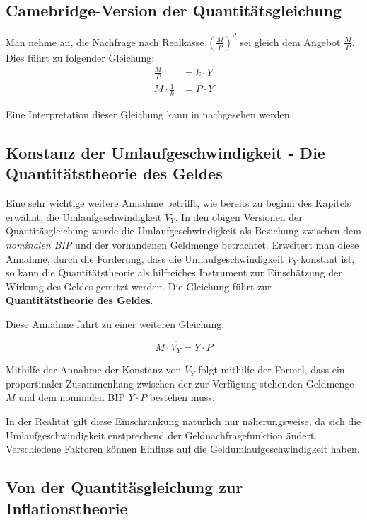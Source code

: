 \subsection{Camebridge-Version der Quantitätsgleichung}

Man nehme an, die Nachfrage nach Realkasse $(\frac{M}{P})^d$ sei gleich dem Angebot $\frac{M}{P}$. Dies führt zu folgender Gleichung\autocite[14]{historyQunatitaetstheorie}:
\begin{align}
    \frac{M}{P} &= k \cdot Y \\
    M \cdot \frac{1}{k} &= P \cdot Y
\end{align}

Eine Interpretation dieser Gleichung kann in \cite[126]{mankiw2017} nachgesehen werden.

\subsection{Konstanz der Umlaufgeschwindigkeit - Die Quantitätstheorie des Geldes}\label{sec:Umlaufgeschwindigkeit}
Eine sehr wichtige weitere Annahme betrifft, wie bereits zu beginn des Kapitels erwähnt, die Umlaufgeschwindigkeit $V_Y$. In den obigen Versionen der Quantitäsgleichung wurde die Umlaufgeschwindigkeit als Beziehung zwischen dem \textit{nominalen BIP} und der vorhandenen Geldmenge betrachtet. Erweitert man diese Annahme, durch die Forderung, dass die Umlaufgeschwindigkeit $\overline{V}_Y$ konstant ist, so kann die Quantitätstheorie als hilfreiches Instrument zur Einschätzung der Wirkung des Geldes genutzt werden. Die Gleichung führt zur \textbf{Quantitätstheorie des Geldes}\autocite[126]{mankiw2017}.

Diese Annahme führt zu einer weiteren Gleichung:

$$M \cdot \overline{V_Y} = Y \cdot P$$\label{qTheorieDesGeldes}

Mithilfe der Annahme der Konstanz von $\overline{V}_Y$ folgt mithilfe der Formel, dass ein proportinaler Zusammenhang zwischen der zur Verfügung stehenden Geldmenge $M$ und dem nominalen BIP $Y \cdot P$ bestehen muss.

In der Realität gilt diese Einschränkung natürlich nur näherungsweise, da sich die Umlaufgeschwindigkeit enstprechend der Geldnachfragefunktion ändert. Verschiedene Faktoren können Einfluss auf die Geldumlaufgeschwindigkeit haben\autocite[126]{mankiw2017}.

\subsection{Von der Quantitäsgleichung zur Inflationstheorie}

